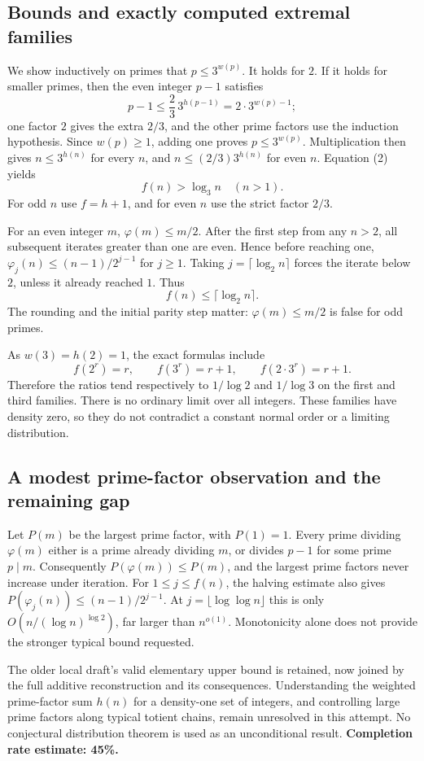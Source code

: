 \subsection*{Bounds and exactly computed extremal families}
We show inductively on primes that $p\le3^{w(p)}$. It holds for $2$. If it holds for smaller primes, then the even integer $p-1$ satisfies
\[
 p-1\le\frac23\,3^{h(p-1)}=2\cdot3^{w(p)-1};
\]
one factor $2$ gives the extra $2/3$, and the other prime factors use the induction hypothesis. Since $w(p)\ge1$, adding one proves $p\le3^{w(p)}$. Multiplication then gives $n\le3^{h(n)}$ for every $n$, and $n\le(2/3)3^{h(n)}$ for even $n$. Equation (2) yields
\[
 f(n)>\log_3 n\quad(n>1). \tag{4}
\]
For odd $n$ use $f=h+1$, and for even $n$ use the strict factor $2/3$.

For an even integer $m$, $\varphi(m)\le m/2$. After the first step from any $n>2$, all subsequent iterates greater than one are even. Hence before reaching one, $\varphi_j(n)\le(n-1)/2^{j-1}$ for $j\ge1$. Taking $j=\lceil\log_2 n\rceil$ forces the iterate below $2$, unless it already reached $1$. Thus
\[
 f(n)\le\lceil\log_2 n\rceil. \tag{5}
\]
The rounding and the initial parity step matter: $\varphi(m)\le m/2$ is false for odd primes.

As $w(3)=h(2)=1$, the exact formulas include
\[
 f(2^r)=r,\qquad f(3^r)=r+1,\qquad f(2\cdot3^r)=r+1.
\]
Therefore the ratios tend respectively to $1/\log2$ and $1/\log3$ on the first and third families. There is no ordinary limit over all integers. These families have density zero, so they do not contradict a constant normal order or a limiting distribution.

\subsection*{A modest prime-factor observation and the remaining gap}
Let $P(m)$ be the largest prime factor, with $P(1)=1$. Every prime dividing $\varphi(m)$ either is a prime already dividing $m$, or divides $p-1$ for some prime $p\mid m$. Consequently $P(\varphi(m))\le P(m)$, and the largest prime factors never increase under iteration.
For $1\le j\le f(n)$, the halving estimate also gives
$P(\varphi_j(n))\le(n-1)/2^{j-1}$. At $j=\lfloor\log\log n\rfloor$ this is only $O(n/(\log n)^{\log2})$, far larger than $n^{o(1)}$. Monotonicity alone does not provide the stronger typical bound requested.

The older local draft's valid elementary upper bound is retained, now joined by the full additive reconstruction and its consequences. Understanding the weighted prime-factor sum $h(n)$ for a density-one set of integers, and controlling large prime factors along typical totient chains, remain unresolved in this attempt. No conjectural distribution theorem is used as an unconditional result.
\textbf{Completion rate estimate: 45\%.}

